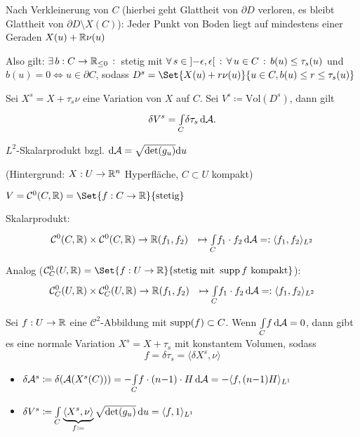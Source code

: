 \documentclass{cheat-sheet}
\begin{document}
Nach Verkleinerung von $C$ (hierbei geht Glattheit von $\partial D$ verloren, es bleibt Glattheit von $\partial D \setminus X(C)$):
Jeder Punkt von Boden liegt auf mindestens einer Geraden $X(u) + \mathbb{R} \nu(u)$

Also gilt: $\exists \, {b : C \to \mathbb{R}_{\leq 0}} \,:\,$ stetig
mit $\forall \, {s \in \left] -\epsilon, \epsilon \right[} \,:\, \forall \, {u \in C} \,:\, b(u) \leq \tau_s(u)$ und $b(u) = 0 \iff u \in \partial C$, sodass $D^s = \Set{X(u) + r \nu(u)}{ u \in C, b(u) \leq r \leq \tau_s(u) }$

\begin{prop}
  Sei $X^s = X + \tau_s \nu$ eine Variation von $X$ auf $C$. Sei $V^s \coloneqq \mathrm{Vol}(D^s)$, dann gilt
  \[ \delta V^s = {\textstyle \int\limits_{C}^{}} \delta \tau_s \,\mathrm{d} \mathcal{A}. \]
\end{prop}

$L^2$-Skalarprodukt bzgl. $\mathrm{d} \mathcal{A} = \sqrt{\det(g_u)} \mathrm{d} u$

(Hintergrund: $X : U \to \mathbb{R}^n$ Hyperfläche, $C \subset U$ kompakt)

$V = \mathcal{C}^0(C, \R) = \Set{ f : C \to \R }{ \text{stetig} }$

Skalarprodukt:
\begin{align*}
  \mathcal{C}^0(C, \mathbb{R}) \times \mathcal{C}^0(C, \mathbb{R}) &\to \mathbb{R}
  (f_1, f_2) &\mapsto {\textstyle \int\limits_{C}^{}} f_1 \cdot f_2 \,\mathrm{d} \mathcal{A} =: \langle f_1 , f_2 \rangle_{L^2}
\end{align*}

Analog ($\mathcal{C}^0_C(U, \R) = \Set{ f : U \to \R }{ \text{stetig mit } \supp f \text{ kompakt} }$):
\begin{align*}
  \mathcal{C}^0_C(U, \mathbb{R}) \times \mathcal{C}^0_C(U, \mathbb{R}) &\to \mathbb{R}
  (f_1, f_2) &\mapsto {\textstyle \int\limits_{C}^{}} f_1 \cdot f_2 \,\mathrm{d} \mathcal{A} =: \langle f_1 , f_2 \rangle_{L^2}
\end{align*}



\begin{lem}
  Sei $f : U \to \mathbb{R}$ eine $\mathcal{C}^2$-Abbildung mit $\mathop{\mathrm{supp}}(f) \subset C$. Wenn ${\textstyle \int\limits_{C}^{}} f \,\mathrm{d} \mathcal{A} = 0$, dann gibt es eine normale Variation $X^s = X + \tau_s$ mit konstantem Volumen, sodass
  \[ f = \delta \tau_s = \langle \delta X^s , \nu \rangle \]
\end{lem}

\begin{nota}
  \begin{itemize}
    \item $\delta \mathcal{A}^s \coloneqq \delta(\mathcal{A}(X^s(C))) = - {\textstyle \int\limits_{C}^{}} f \cdot (n{-}1) \cdot H \,\mathrm{d} \mathcal{A} = - \langle f, (n{-}1) H \rangle_{L^1}$
    \item $\delta V^s \coloneqq {\textstyle \int\limits_{C}^{}} \underbrace{\langle X^s , \nu \rangle}_{f \coloneqq} \sqrt{\det(g_u)} \,\mathrm{d} u = \langle f , 1 \rangle_{L^1}$
  \end{itemize}
\end{nota}
\end{document}
